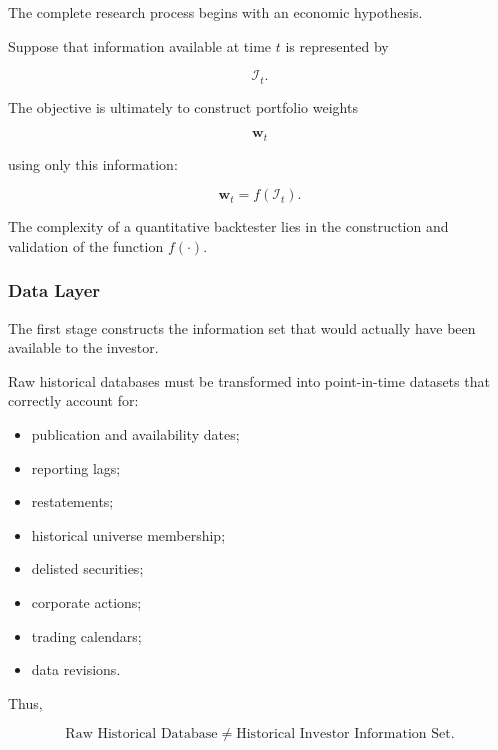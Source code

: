 \documentclass[11pt,a4paper]{article}
\begin{document}
The complete research process begins with an economic hypothesis.

Suppose that information available at time $t$ is represented by

\begin{equation}
\mathcal{I}_t.
\end{equation}

The objective is ultimately to construct portfolio weights

\begin{equation}
\mathbf{w}_t
\end{equation}

using only this information:

\begin{equation}
\boxed{
\mathbf{w}_t
=
f
\left(
\mathcal{I}_t
\right).
}
\end{equation}

The complexity of a quantitative backtester lies in the construction and
validation of the function $f(\cdot)$.


\subsubsection{Data Layer}

The first stage constructs the information set that would actually have been
available to the investor.

Raw historical databases must be transformed into point-in-time datasets that
correctly account for:

\begin{itemize}
    \item publication and availability dates;
    \item reporting lags;
    \item restatements;
    \item historical universe membership;
    \item delisted securities;
    \item corporate actions;
    \item trading calendars;
    \item data revisions.
\end{itemize}

Thus,

\begin{equation}
\boxed{
\text{Raw Historical Database}
\neq
\text{Historical Investor Information Set}.
}
\end{equation}
\end{document}

